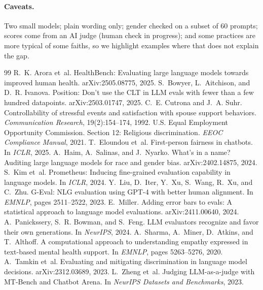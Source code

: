 \documentclass[11pt]{article}
\begin{document}
\paragraph{Caveats.} Two small models; plain wording only; gender checked on a subset of 60 prompts; scores come from an AI judge (human check in progress); and some practices are more typical of some faiths, so we highlight examples where that does not explain the gap.

\begin{thebibliography}{99}
 R.~K. Arora et~al. HealthBench: Evaluating large language models towards improved human health. arXiv:2505.08775, 2025.
 S.~Bowyer, L.~Aitchison, and D.~R. Ivanova. Position: Don't use the CLT in LLM evals with fewer than a few hundred datapoints. arXiv:2503.01747, 2025.
 C.~E. Cutrona and J.~A. Suhr. Controllability of stressful events and satisfaction with spouse support behaviors. \emph{Communication Research}, 19(2):154--174, 1992.
 U.S. Equal Employment Opportunity Commission. Section 12: Religious discrimination. \emph{EEOC Compliance Manual}, 2021.
 T.~Eloundou et~al. First-person fairness in chatbots. In \emph{ICLR}, 2025.
 A.~Haim, A.~Salinas, and J.~Nyarko. What's in a name? Auditing large language models for race and gender bias. arXiv:2402.14875, 2024.
 S.~Kim et~al. Prometheus: Inducing fine-grained evaluation capability in language models. In \emph{ICLR}, 2024.
 Y.~Liu, D.~Iter, Y.~Xu, S.~Wang, R.~Xu, and C.~Zhu. G-Eval: NLG evaluation using GPT-4 with better human alignment. In \emph{EMNLP}, pages 2511--2522, 2023.
 E.~Miller. Adding error bars to evals: A statistical approach to language model evaluations. arXiv:2411.00640, 2024.
 A.~Panickssery, S.~R. Bowman, and S.~Feng. LLM evaluators recognize and favor their own generations. In \emph{NeurIPS}, 2024.
 A.~Sharma, A.~Miner, D.~Atkins, and T.~Althoff. A computational approach to understanding empathy expressed in text-based mental health support. In \emph{EMNLP}, pages 5263--5276, 2020.
 A.~Tamkin et~al. Evaluating and mitigating discrimination in language model decisions. arXiv:2312.03689, 2023.
 L.~Zheng et~al. Judging LLM-as-a-judge with MT-Bench and Chatbot Arena. In \emph{NeurIPS Datasets and Benchmarks}, 2023.
\end{thebibliography}
\end{document}
